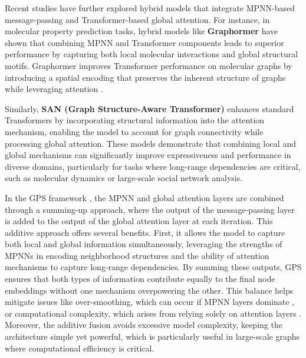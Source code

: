 \documentclass{acmart}
\begin{document}
Recent studies have further explored hybrid models that integrate MPNN-based message-passing and Transformer-based global attention. For instance, in molecular property prediction tasks, hybrid models like \textbf{Graphormer} \cite{ying2021transformersreallyperformbad, shi2023benchmarkinggraphormerlargescalemolecular} have shown that combining MPNN and Transformer components leads to superior performance by capturing both local molecular interactions and global structural motifs. Graphormer improves Transformer performance on molecular graphs by introducing a spatial encoding that preserves the inherent structure of graphs while leveraging attention \cite{vaswani2023attentionneed, gilmer2017neuralmessagepassingquantum}.

Similarly, \textbf{SAN (Graph Structure-Aware Transformer)} \cite{kreuzer2021rethinkinggraphtransformersspectral} enhances standard Transformers by incorporating structural information into the attention mechanism, enabling the model to account for graph connectivity while processing global attention. These models demonstrate that combining local and global mechanisms can significantly improve expressiveness and performance in diverse domains, particularly for tasks where long-range dependencies are critical, such as molecular dynamics or large-scale social network analysis.

In the GPS framework \cite{rampášek2023recipegeneralpowerfulscalable}, the MPNN and global attention layers are combined through a summing-up approach, where the output of the message-passing layer is added to the output of the global attention layer at each iteration. This additive approach offers several benefits. First, it allows the model to capture both local and global information simultaneously, leveraging the strengths of MPNNs in encoding neighborhood structures and the ability of attention mechanisms to capture long-range dependencies. By summing these outputs, GPS ensures that both types of information contribute equally to the final node embeddings without one mechanism overpowering the other. This balance helps mitigate issues like over-smoothing, which can occur if MPNN layers dominate \cite{oono2021graphneuralnetworksexponentially}, or computational complexity, which arises from relying solely on attention layers \cite{vaswani2023attentionneed}. Moreover, the additive fusion avoids excessive model complexity, keeping the architecture simple yet powerful, which is particularly useful in large-scale graphs where computational efficiency is critical.
\end{document}
